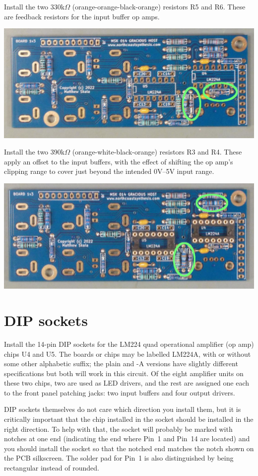 Install the two 330k$\Omega$ (orange-orange-black-orange) resistors R5 and
R6.  These are feedback resistors for the input buffer op amps.

\nopagebreak
\noindent\includegraphics[width=\linewidth]{res-330k.jpg}

Install the two 390k$\Omega$ (orange-white-black-orange) resistors R3 and
R4.  These apply an offset to the input buffers, with the effect of shifting
the op amp's clipping range to cover just beyond the intended 0V--5V input
range.

\nopagebreak
\noindent\includegraphics[width=\linewidth]{res-390k.jpg}

\section{DIP sockets}

Install the 14-pin DIP sockets for the LM224 quad operational
amplifier (op amp) chips U4 and U5.  The boards or chips may be labelled
LM224A, with or without some other alphabetic suffix; the plain and -A versions
have slightly different specifications but both will work in this circuit.
Of the eight amplifier units on these
two chips, two are used as LED drivers, and the rest are assigned one each
to the front panel patching jacks:  two input buffers and four output
drivers.

DIP sockets
themselves do not care which direction you install them, but it is
critically important that the chip installed in the socket should be
installed in the right direction.  To help with that, the socket will
probably be marked with notches at one end (indicating the end where Pin~1
and Pin~14 are located) and you should install the socket so that the
notched end matches the notch shown on the PCB silkscreen.  The solder pad
for Pin~1 is also distinguished by being rectangular instead of rounded.


